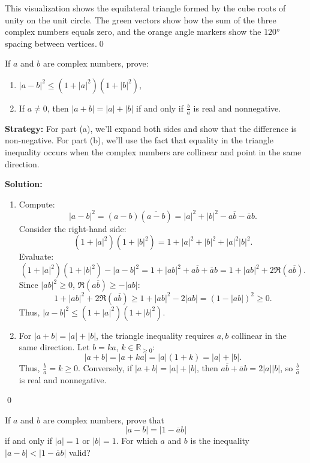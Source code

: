 This visualization shows the equilateral triangle formed by the cube roots of unity on the unit circle. The green vectors show how the sum of the three complex numbers equals zero, and the orange angle markers show the $120°$ spacing between vertices.\qed


\begin{problembox}
\begin{problemstatement}
If \( a \) and \( b \) are complex numbers, prove:
\begin{enumerate}[label=\alph*)]
\item \( |a - b|^2 \leq (1 + |a|^2)(1 + |b|^2) \),
\item If \( a \neq 0 \), then \( |a + b| = |a| + |b| \) if and only if \( \frac{b}{a} \) is real and nonnegative.
\end{enumerate}
\end{problemstatement}
\end{problembox}

\noindent\textbf{Strategy:} For part (a), we'll expand both sides and show that the difference is non-negative. For part (b), we'll use the fact that equality in the triangle inequality occurs when the complex numbers are collinear and point in the same direction.

\bigskip\noindent\textbf{Solution:}
\begin{enumerate}[label=\alph*)]
\item Compute:
\[
|a - b|^2 = (a - b)(\overline{a - b}) = |a|^2 + |b|^2 - a\overline{b} - \overline{a}b.
\]
Consider the right-hand side:
\[
(1 + |a|^2)(1 + |b|^2) = 1 + |a|^2 + |b|^2 + |a|^2 |b|^2.
\]
Evaluate:
\[
(1 + |a|^2)(1 + |b|^2) - |a - b|^2 = 1 + |a b|^2 + a\overline{b} + \overline{a}b = 1 + |a b|^2 + 2\Re(a\overline{b}).
\]
Since \( |a b|^2 \geq 0 \), \( \Re(a\overline{b}) \geq -|a b| \):
\[
1 + |a b|^2 + 2\Re(a\overline{b}) \geq 1 + |a b|^2 - 2|a b| = (1 - |a b|)^2 \geq 0.
\]
Thus, \( |a - b|^2 \leq (1 + |a|^2)(1 + |b|^2) \).
\item For \( |a + b| = |a| + |b| \), the triangle inequality requires \( a, b \) collinear in the same direction. Let \( b = ka \), \( k \in \mathbb{R}_{\geq 0} \):
\[
|a + b| = |a + ka| = |a|(1 + k) = |a| + |b|.
\]
Thus, \( \frac{b}{a} = k \geq 0 \). Conversely, if \( |a + b| = |a| + |b| \), then \( a\overline{b} + \overline{a}b = 2|a||b| \), so \( \frac{b}{a} \) is real and nonnegative.
\end{enumerate}\qed


\begin{problembox}
\begin{problemstatement}
If \( a \) and \( b \) are complex numbers, prove that
\[
|a - b| = |1 - \overline{a}b|
\]
if and only if \( |a| = 1 \) or \( |b| = 1 \). For which \( a \) and \( b \) is the inequality \( |a - b| < |1 - \overline{a}b| \) valid?
\end{problemstatement}
\end{problembox}

